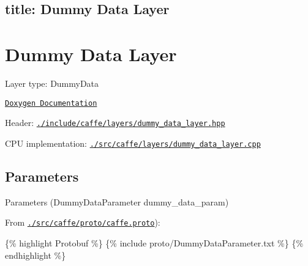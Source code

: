 

 \subsection*{title\+: Dummy Data Layer }

\section*{Dummy Data Layer}


\begin{DoxyItemize}
\item Layer type\+: {\ttfamily Dummy\+Data}
\item \href{http://caffe.berkeleyvision.org/doxygen/classcaffe_1_1DummyDataLayer.html}{\tt Doxygen Documentation}
\item Header\+: \href{https://github.com/BVLC/caffe/blob/master/include/caffe/layers/dummy_data_layer.hpp}{\tt {\ttfamily ./include/caffe/layers/dummy\+\_\+data\+\_\+layer.hpp}}
\item C\+PU implementation\+: \href{https://github.com/BVLC/caffe/blob/master/src/caffe/layers/dummy_data_layer.cpp}{\tt {\ttfamily ./src/caffe/layers/dummy\+\_\+data\+\_\+layer.cpp}}
\end{DoxyItemize}

\subsection*{Parameters}


\begin{DoxyItemize}
\item Parameters ({\ttfamily Dummy\+Data\+Parameter dummy\+\_\+data\+\_\+param})
\item From \href{https://github.com/BVLC/caffe/blob/master/src/caffe/proto/caffe.proto}{\tt {\ttfamily ./src/caffe/proto/caffe.proto}})\+:
\end{DoxyItemize}

\{\% highlight Protobuf \%\} \{\% include proto/\+Dummy\+Data\+Parameter.\+txt \%\} \{\% endhighlight \%\} 
